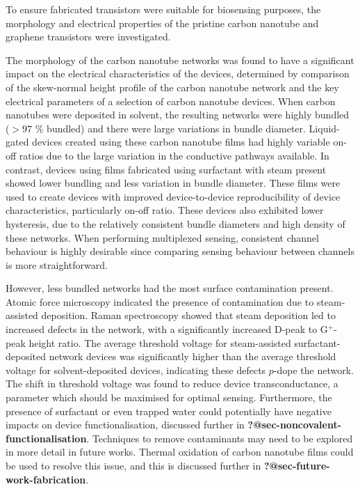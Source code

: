 \documentclass[
  a4paper,
]{scrbook}
\begin{document}
To ensure fabricated transistors were suitable for biosensing purposes,
the morphology and electrical properties of the pristine carbon nanotube
and graphene transistors were investigated.

The morphology of the carbon nanotube networks was found to have a
significant impact on the electrical characteristics of the devices,
determined by comparison of the skew-normal height profile of the carbon
nanotube network and the key electrical parameters of a selection of
carbon nanotube devices. When carbon nanotubes were deposited in
solvent, the resulting networks were highly bundled (\(>97\) \% bundled)
and there were large variations in bundle diameter. Liquid-gated devices
created using these carbon nanotube films had highly variable on-off
ratios due to the large variation in the conductive pathways available.
In contrast, devices using films fabricated using surfactant with steam
present showed lower bundling and less variation in bundle diameter.
These films were used to create devices with improved device-to-device
reproducibility of device characteristics, particularly on-off ratio.
These devices also exhibited lower hysteresis, due to the relatively
consistent bundle diameters and high density of these networks. When
performing multiplexed sensing, consistent channel behaviour is highly
desirable since comparing sensing behaviour between channels is more
straightforward.

However, less bundled networks had the most surface contamination
present. Atomic force microscopy indicated the presence of contamination
due to steam-assisted deposition. Raman spectroscopy showed that steam
deposition led to increased defects in the network, with a significantly
increased D-peak to G\(^+\)-peak height ratio. The average threshold
voltage for steam-assisted surfactant-deposited network devices was
significantly higher than the average threshold voltage for
solvent-deposited devices, indicating these defects \(p\)-dope the
network. The shift in threshold voltage was found to reduce device
transconductance, a parameter which should be maximised for optimal
sensing. Furthermore, the presence of surfactant or even trapped water
could potentially have negative impacts on device functionalisation,
discussed further in \textbf{?@sec-noncovalent-functionalisation}.
Techniques to remove contaminants may need to be explored in more detail
in future works. Thermal oxidation of carbon nanotube films could be
used to resolve this issue, and this is discussed further in
\textbf{?@sec-future-work-fabrication}.
\end{document}
